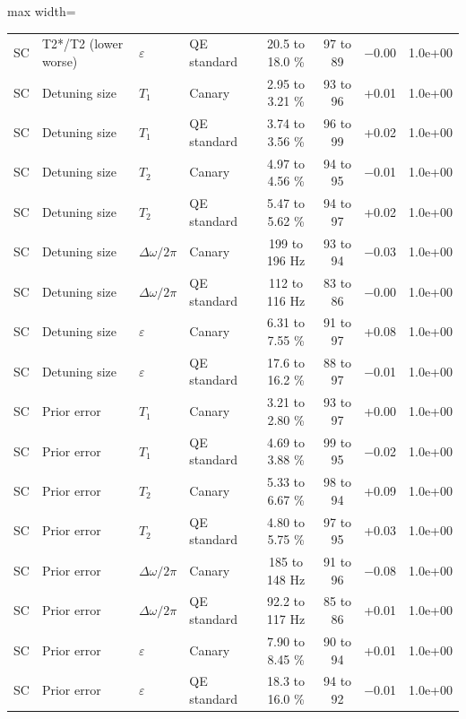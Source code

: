 \begin{table}[!t]
\begin{adjustbox}{max width=\linewidth}
\begin{tabular}{llllcccc}
SC & T2*/T2 (lower worse) & $\varepsilon$ & QE standard & 20.5 to 18.0 \% & 97 to 89 & $-$0.00 & 1.0e+00 \\
SC & Detuning size & $T_1$ & Canary & 2.95 to 3.21 \% & 93 to 96 & +0.01 & 1.0e+00 \\
SC & Detuning size & $T_1$ & QE standard & 3.74 to 3.56 \% & 96 to 99 & +0.02 & 1.0e+00 \\
SC & Detuning size & $T_2$ & Canary & 4.97 to 4.56 \% & 94 to 95 & $-$0.01 & 1.0e+00 \\
SC & Detuning size & $T_2$ & QE standard & 5.47 to 5.62 \% & 94 to 97 & +0.02 & 1.0e+00 \\
SC & Detuning size & $\Delta\omega/2\pi$ & Canary & 199 to 196 Hz & 93 to 94 & $-$0.03 & 1.0e+00 \\
SC & Detuning size & $\Delta\omega/2\pi$ & QE standard & 112 to 116 Hz & 83 to 86 & $-$0.00 & 1.0e+00 \\
SC & Detuning size & $\varepsilon$ & Canary & 6.31 to 7.55 \% & 91 to 97 & +0.08 & 1.0e+00 \\
SC & Detuning size & $\varepsilon$ & QE standard & 17.6 to 16.2 \% & 88 to 97 & $-$0.01 & 1.0e+00 \\
SC & Prior error & $T_1$ & Canary & 3.21 to 2.80 \% & 93 to 97 & +0.00 & 1.0e+00 \\
SC & Prior error & $T_1$ & QE standard & 4.69 to 3.88 \% & 99 to 95 & $-$0.02 & 1.0e+00 \\
SC & Prior error & $T_2$ & Canary & 5.33 to 6.67 \% & 98 to 94 & +0.09 & 1.0e+00 \\
SC & Prior error & $T_2$ & QE standard & 4.80 to 5.75 \% & 97 to 95 & +0.03 & 1.0e+00 \\
SC & Prior error & $\Delta\omega/2\pi$ & Canary & 185 to 148 Hz & 91 to 96 & $-$0.08 & 1.0e+00 \\
SC & Prior error & $\Delta\omega/2\pi$ & QE standard & 92.2 to 117 Hz & 85 to 86 & +0.01 & 1.0e+00 \\
SC & Prior error & $\varepsilon$ & Canary & 7.90 to 8.45 \% & 90 to 94 & +0.01 & 1.0e+00 \\
SC & Prior error & $\varepsilon$ & QE standard & 18.3 to 16.0 \% & 94 to 92 & $-$0.01 & 1.0e+00 \\
\hline
\end{tabular}
\end{adjustbox}
\end{table}
\addtocounter{table}{-1}
